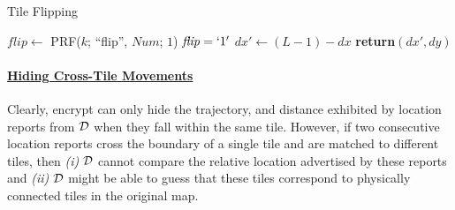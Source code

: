 \documentclass{llncs}
\newcommand\MK{\mathit{k}}
\newcommand\LENGTH{\mathit{L}}
\begin{document}
\begin{algorithm}[tbp]
\caption{Tile Flipping}
\label{alg:flip}
\begin{algorithmic}[1]
\Procedure{flipTile}{$x,y,\MK$}
\State $\mathit{flip} \gets$ PRF($\MK$; ``flip'', $\mathit{Num}$; $1$)
\If $\mathit{flip} = `1'$
	\State $dx' \gets (\LENGTH-1) - dx$
\EndIf
\State \textbf{return}$(dx', dy)$
\EndProcedure
\end{algorithmic}
\end{algorithm}


\vspace{-1 em}\paragraph{\underline{Hiding Cross-Tile Movements}\\}

Clearly, {\sf encrypt} can only hide the trajectory, and distance exhibited by location reports from $\cal D$ when they fall within the same tile. However, if two consecutive
location reports cross the boundary of a single tile and are matched to different tiles, then \emph{(i)} $\cal D$ cannot compare the relative location advertised by these reports
and \emph{(ii)} $\cal D$ might be able to guess that these tiles correspond to physically connected tiles in the original map.
\end{document}
